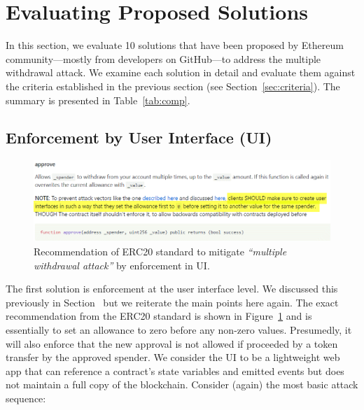 
\section{Evaluating Proposed Solutions}\label{sec:eval}

In this section, we evaluate 10 solutions that have been proposed by Ethereum community---mostly from developers on GitHub---to address the multiple withdrawal attack. We examine each solution in detail and evaluate them against the criteria established in the previous section (see Section~\ref{sec:criteria}). The summary is presented in Table~\ref{tab:comp}.

\subsection{Enforcement by User Interface (UI)}
\label{sec:enfui}

\begin{figure}[t!]
	\centering
	\includegraphics[width=1.0\linewidth]{figures/multiple_withdrawal_03.png}
	\caption{Recommendation of ERC20 standard to mitigate \textit{``multiple withdrawal attack''} by enforcement in UI.\label{fig:uie}}
\end{figure}

The first solution is enforcement at the user interface level. We discussed this previously in Section~\label{sec:preui} but we reiterate the main points here again. The exact recommendation from the ERC20 standard is shown in Figure~\ref{fig:uie} and is essentially to set an allowance to zero before any non-zero values. Presumedly, it will also enforce that the new approval is not allowed if proceeded by a token transfer by the approved spender. We consider the UI to be a lightweight web app that can reference a contract's state variables and emitted events but does not maintain a full copy of the blockchain. Consider (again) the most basic attack sequence:


